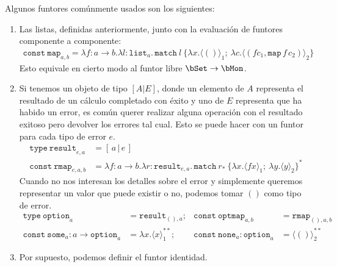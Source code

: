 \begin{example}
  Algunos funtores comúnmente usados son los siguientes:
  \begin{enumerate}
  \item Las listas, definidas anteriormente, junto con la evaluación de funtores
    componente a componente:
    \begin{multline*}
      \mathtt{const\ map}_{a,b}=
      \lambda f:a\to b.\lambda l:\mathtt{list}_a.\,
      \mathtt{match\ }l\ \{\lambda x.\langle()\rangle_1;\ \lambda c.\langle(fc_1,\mathtt{map}\,f\,c_2)\rangle_2\}
      \end{multline*}
      Esto equivale en cierto modo al funtor libre $\bSet\to\bMon$.
    \item Si tenemos un objeto de tipo $[A|E]$, donde un elemento de $A$
      representa el resultado de un cálculo completado con éxito y uno de $E$
      representa que ha habido un error, es común querer realizar alguna
      operación con el resultado exitoso pero devolver los errores tal
      cual. Esto se puede hacer con un funtor para cada tipo de error $e$.
      \begin{align*}
        \mathtt{type\ result}_{e,a} & = [\,a\,|\,e\,]\\
        \mathtt{const\ rmap}_{e,a,b} & = \lambda f:a\to b.\lambda r:
                                       \mathtt{result}_{e,a}.\,\mathtt{match}\ r_*\ \{
                                       \lambda x.\langle fx\rangle_1;\ \lambda y.\langle y\rangle_2\}^*
      \end{align*}
      Cuando no nos interesan los detalles sobre el error y simplemente queremos
      representar un valor que puede existir o no, podemos tomar $()$ como tipo de error.
      \begin{align*}
        \mathtt{type\ option}_a & = \mathtt{result}_{(),a};
        & \mathtt{const\ optmap}_{a,b} & = \mathtt{rmap}_{(),a,b} \\
        \mathtt{const\ some}_a : a\to\mathtt{option}_a & = \lambda x.\langle x\rangle_1^{**};
        & \mathtt{const\ none}_a : \mathtt{option}_a & = \langle()\rangle_2^{**}
      \end{align*}
    \item Por supuesto, podemos definir el funtor identidad.

\end{enumerate}
\end{example}
